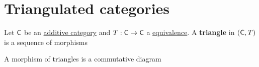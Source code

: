 \documentclass[../../main]{subfiles}
\begin{document}
\chapter{Triangulated categories}

\begin{definition}[Triangle]\label{def:triangle}
  Let \(\mathsf{C}\) be an \hyperref[def:additive-category]{additive category} and \(T: \mathsf{C} \to \mathsf{C}\) a \hyperref[def:equivalent-categories]{equivalence}.
  A \textbf{triangle} in \((\mathsf{C}, T)\) is a sequence of morphisms
  \begin{center}
  \end{center}
  A morphism of triangles is a commutative diagram
  \begin{center}
  \end{center}
\end{definition}
\end{document}
